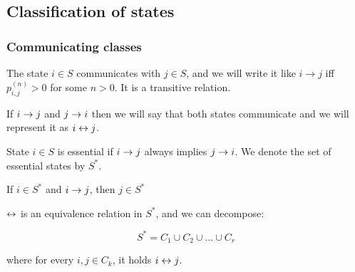\subsection{Classification of states}
 \begin{frame}\frametitle{Communicating classes}

    \begin{definition}
    The state \(i\in S\) communicates with \(j\in S\), and we will write it like 
    \(i \rightarrow j\) iff \(p_{i,j}^{(n)} > 0\) for some \(n > 0\). It is a 
    transitive relation.

    If \(i \rightarrow j\) and \(j \rightarrow i\) then we will say that both states communicate and
    we will represent it as \(i \leftrightarrow j\).
    \end{definition}

    \begin{definition}
    State \(i\in S\) is essential if \(i \rightarrow j\) always implies \(j \rightarrow i\). We denote the set
    of essential states by \(S^{\ast}\).
    \end{definition}

    \begin{lemma}
    If \(i\in S^{\ast}\) and \(i \rightarrow j\), then \(j \in S^{\ast}\)
    \end{lemma}

    \begin{proposition}
    \(\leftrightarrow\) is an equivalence relation in \(S^{\ast}\), and we can decompose:

    \[
    S^{\ast} = C_1 \cup C_2 \cup \ldots \cup C_r
    \]

    where for every \(i, j \in C_k\), it holds \(i \leftrightarrow j\).
    \end{proposition}
 \end{frame}

